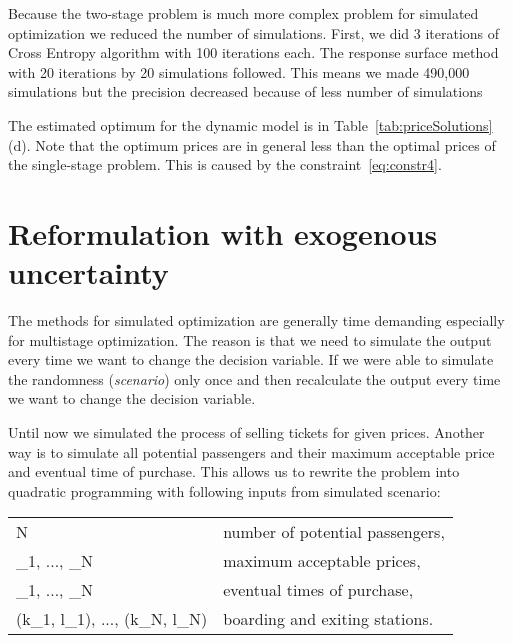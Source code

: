 Because the two-stage problem is much more complex problem for simulated optimization we reduced the number of simulations.
First, we did 3 iterations of Cross Entropy algorithm with 100 iterations each.
The response surface method with 20 iterations by 20 simulations followed.
This means we made 490,000 simulations but the precision decreased because of less number of simulations

The estimated optimum for the dynamic model is in Table~\ref{tab:priceSolutions} (d).
Note that the optimum prices are in general less than the optimal prices of the single-stage problem.
This is caused by the constraint~\eqref{eq:constr4}.





\section{Reformulation with exogenous uncertainty}
	\label{chap:exogenousReformulation}
	
The methods for simulated optimization are generally time demanding especially for multistage optimization. The reason is that we need to simulate the output every time we want to change the decision variable. If we were able to simulate the randomness (\emph{scenario}) only once and then recalculate the output every time we want to change the decision variable.

Until now we simulated the process of selling tickets for given prices. Another way is to simulate all potential passengers and their maximum acceptable price and eventual time of purchase. This allows us to rewrite the problem into quadratic programming with following inputs from simulated scenario:
\begin{center}
	\begin{tabular}{ll}
		N & number of potential passengers, \\
		\pi_1, ..., \pi_N & maximum acceptable prices, \\
		\tau_1, ..., \tau_N & eventual times of purchase, \\
		(k_1, l_1), ..., (k_N, l_N) & boarding and exiting stations.
	\end{tabular}
\end{center}

